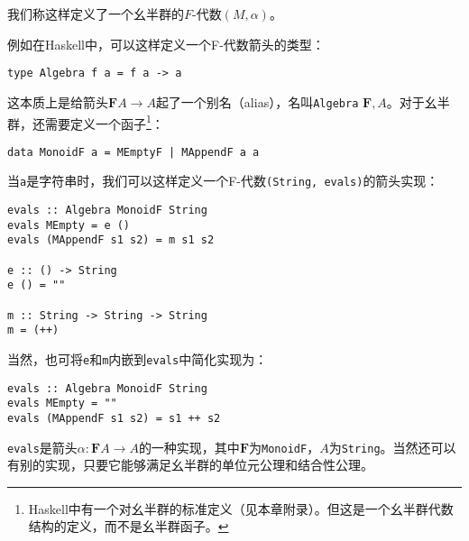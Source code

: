 \documentclass{article}
\begin{document}
\begin{example}
我们称这样定义了一个幺半群的$F$-代数$(M, \alpha)$。

例如在Haskell中，可以这样定义一个F-代数箭头的类型：

\begin{lstlisting}
type Algebra f a = f a -> a
\end{lstlisting}

这本质上是给箭头$\mathbf{F}A \to A$起了一个别名（alias），名叫\texttt{Algebra} $\mathbf{F}, A$。对于幺半群，还需要定义一个函子\footnote{
Haskell中有一个对幺半群的标准定义（见本章附录）。但这是一个幺半群代数结构的定义，而不是幺半群函子。}：

\begin{lstlisting}
data MonoidF a = MEmptyF | MAppendF a a
\end{lstlisting}

当\texttt{a}是字符串时，我们可以这样定义一个F-代数\texttt{(String, evals)}的箭头实现：

\begin{lstlisting}
evals :: Algebra MonoidF String
evals MEmpty = e ()
evals (MAppendF s1 s2) = m s1 s2

e :: () -> String
e () = ""

m :: String -> String -> String
m = (++)
\end{lstlisting}

当然，也可将\texttt{e}和\texttt{m}内嵌到\texttt{evals}中简化实现为：

\begin{lstlisting}
evals :: Algebra MonoidF String
evals MEmpty = ""
evals (MAppendF s1 s2) = s1 ++ s2
\end{lstlisting}

\texttt{evals}是箭头$\alpha : \mathbf{F}A \to A$的一种实现，其中$\mathbf{F}$为\texttt{MonoidF}，$A$为\texttt{String}。当然还可以有别的实现，只要它能够满足幺半群的单位元公理和结合性公理。
\end{example}
\end{document}
